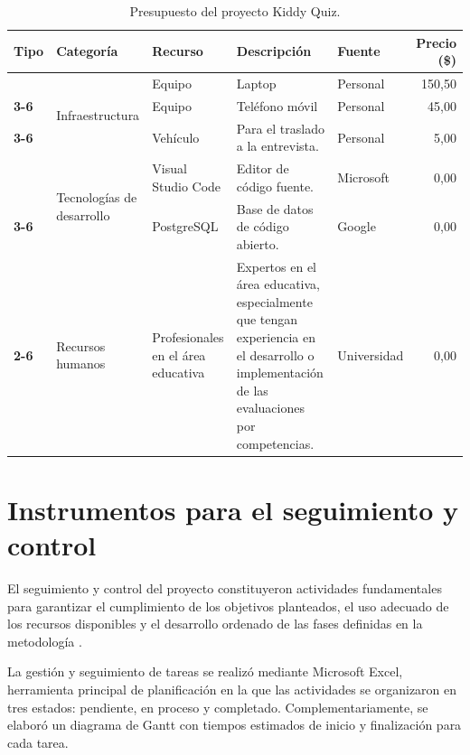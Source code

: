 \begin{table}[H]
\centering
\caption{Presupuesto del proyecto Kiddy Quiz.}
\label{tab:presupuesto}
\footnotesize
\renewcommand{\arraystretch}{1.4}
\begin{tabularx}{\textwidth}{|>{\bfseries}p{2.2cm}|p{2.4cm}|p{2.2cm}|X|p{2cm}|r|}
\hline
\rowcolor{headblue}
\textbf{Tipo} &
\textbf{Categoría} &
\textbf{Recurso} &
\textbf{Descripción} &
\textbf{Fuente} &
\textbf{Precio (\$)} \\\hline

\multirow{3}{2.2cm}{\centering Recursos disponibles} &
\multirow{3}{2.4cm}{\centering Infraestructura} &
Equipo &
Laptop &
Personal &
150{,}50 \\\cline{3-6}

& &
Equipo &
Teléfono móvil &
Personal &
45{,}00 \\\cline{3-6}

& &
Vehículo &
Para el traslado a la entrevista. &
Personal &
5{,}00 \\\hline

\multirow{3}{2.2cm}{\centering Recursos necesarios} &
\multirow{2}{2.4cm}{\centering Tecnologías de desarrollo} &
Visual Studio Code &
Editor de código fuente. &
Microsoft &
0{,}00 \\\cline{3-6}

& &
PostgreSQL &
Base de datos de código abierto. &
Google &
0{,}00 \\\cline{2-6}

&
Recursos humanos &
Profesionales en el área educativa &
Expertos en el área educativa, especialmente que tengan experiencia en el desarrollo o implementación de las evaluaciones por competencias. &
Universidad &
0{,}00 \\\hline

\end{tabularx}
\end{table}
\fuenteautor

\section{Instrumentos para el seguimiento y control}

El seguimiento y control del proyecto constituyeron actividades fundamentales para garantizar el cumplimiento de los objetivos planteados, el uso adecuado de los recursos disponibles y el desarrollo ordenado de las fases definidas en la metodología \cite{beck2004xp,dyba2008agile}.

La gestión y seguimiento de tareas se realizó mediante Microsoft Excel, herramienta principal de planificación en la que las actividades se organizaron en tres estados: pendiente, en proceso y completado. Complementariamente, se elaboró un diagrama de Gantt con tiempos estimados de inicio y finalización para cada tarea.

